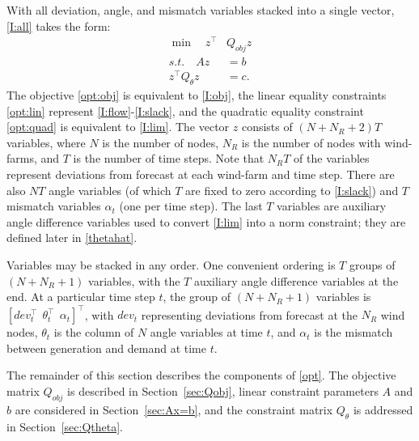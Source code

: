 \documentclass[conference]{IEEEtran}
\begin{document}
With all deviation, angle, and mismatch variables stacked into a single vector, \eqref{I:all} takes the form:
\begin{subequations}\label{opt}
\begin{align}
\label{opt:obj} \min\quad z^\top &Q_{obj} z \\
\label{opt:lin}  s.t.\quad Az &= b  \\
\label{opt:quad}  z^\top Q_{\theta}z &= c.
\end{align}
\end{subequations}
The objective \eqref{opt:obj} is equivalent to \eqref{I:obj}, the
linear equality constraints \eqref{opt:lin} represent
\eqref{I:flow}-\eqref{I:slack}, and the quadratic equality constraint
\eqref{opt:quad} is equivalent to \eqref{I:lim}. The vector $z$
consists of $(N+N_R+2)T$ variables, where $N$ is the number of nodes,
$N_R$ is the number of nodes with wind-farms, and $T$ is the number of
time steps. Note that $N_RT$ of the variables represent deviations
from forecast at each wind-farm and time step. There are also $NT$
angle variables (of which $T$ are fixed to zero according to
\eqref{I:slack}) and $T$ mismatch variables $\alpha_t$ (one per time
step). The last $T$ variables are auxiliary angle difference variables
used to convert \eqref{I:lim} into a norm constraint; they are defined
later in \eqref{thetahat}.

Variables may be stacked in any order. One convenient ordering is $T$
groups of $(N+N_R+1)$ variables, with the $T$ auxiliary angle
difference variables at the end. At a particular time step $t$, the
group of $(N+N_R+1)$ variables is $[dev_t^\top ~~ \theta_t^\top ~~
  \alpha_t ]^\top$, with $dev_t$ representing deviations from forecast
at the $N_R$ wind nodes, $\theta_t$ is the column of $N$ angle
variables at time $t$, and $\alpha_t$ is the mismatch between
generation and demand at time $t$.

The remainder of this section describes the components of
\eqref{opt}. The objective matrix $Q_{obj}$ is described in
Section~\ref{sec:Qobj}, linear constraint parameters $A$ and $b$ are
considered in Section~\ref{sec:Ax=b}, and the constraint matrix
$Q_{\theta}$ is addressed in Section~\ref{sec:Qtheta}.





%

\end{document}
